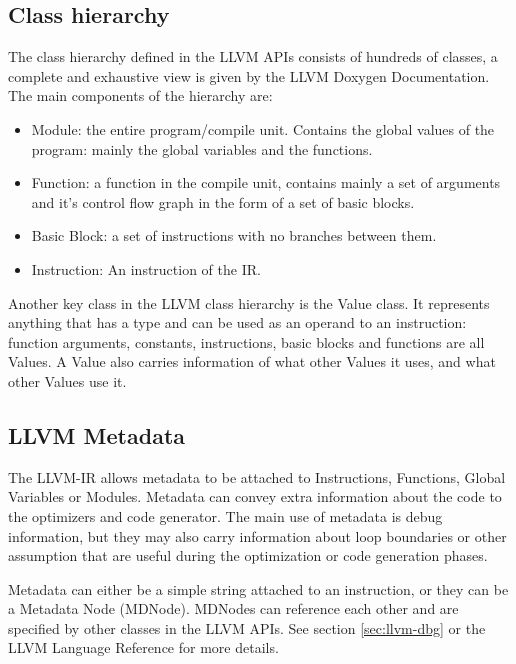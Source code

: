\subsection{Class hierarchy}
The class hierarchy defined in the LLVM APIs consists of hundreds of classes, a complete and exhaustive view is given by the LLVM Doxygen Documentation. The main components of the hierarchy are:
\begin{itemize}
\item Module: the entire program/compile unit. Contains the global values of the program: mainly the global variables and the functions.
\item Function: a function in the compile unit, contains mainly a set of arguments and it's control flow graph in the form of a set of basic blocks.
\item Basic Block: a set of instructions with no branches between them.
\item Instruction: An instruction of the IR.
\end{itemize}
Another key class in the LLVM class hierarchy is the Value class. It represents anything that has a type and can be used as an operand to an instruction: function arguments, constants, instructions, basic blocks and functions are all Values.
A Value also carries information of what other Values it uses, and what other Values use it.

\subsection{LLVM Metadata}
The LLVM-IR allows metadata to be attached to Instructions, Functions, Global Variables or  Modules. Metadata can convey extra information about the code to the optimizers and code generator.
The main use of metadata is debug information, but they may also carry information about loop boundaries or other assumption that are useful during the optimization or code generation phases. \par
Metadata can either be a simple string attached to an instruction, or they can be a Metadata Node (MDNode). MDNodes can reference each other and are specified by other classes in the LLVM APIs. See section \ref{sec:llvm-dbg} or the LLVM Language Reference \cite{llvm-langref} for more details.


